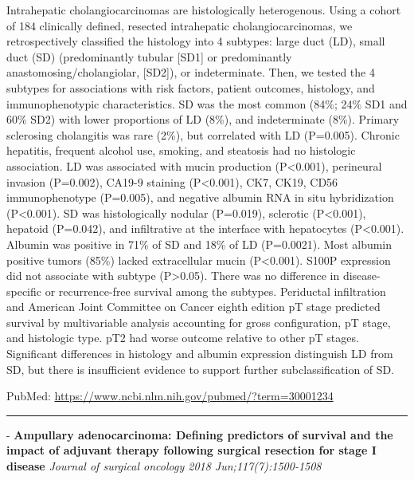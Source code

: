 \documentclass[]{article}
\begin{document}
Intrahepatic cholangiocarcinomas are histologically heterogenous. Using
a cohort of 184 clinically defined, resected intrahepatic
cholangiocarcinomas, we retrospectively classified the histology into 4
subtypes: large duct (LD), small duct (SD) (predominantly tubular
{[}SD1{]} or predominantly anastomosing/cholangiolar, {[}SD2{]}), or
indeterminate. Then, we tested the 4 subtypes for associations with risk
factors, patient outcomes, histology, and immunophenotypic
characteristics. SD was the most common (84\%; 24\% SD1 and 60\% SD2)
with lower proportions of LD (8\%), and indeterminate (8\%). Primary
sclerosing cholangitis was rare (2\%), but correlated with LD (P=0.005).
Chronic hepatitis, frequent alcohol use, smoking, and steatosis had no
histologic association. LD was associated with mucin production
(P\textless{}0.001), perineural invasion (P=0.002), CA19-9 staining
(P\textless{}0.001), CK7, CK19, CD56 immunophenotype (P=0.005), and
negative albumin RNA in situ hybridization (P\textless{}0.001). SD was
histologically nodular (P=0.019), sclerotic (P\textless{}0.001),
hepatoid (P=0.042), and infiltrative at the interface with hepatocytes
(P\textless{}0.001). Albumin was positive in 71\% of SD and 18\% of LD
(P=0.0021). Most albumin positive tumors (85\%) lacked extracellular
mucin (P\textless{}0.001). S100P expression did not associate with
subtype (P\textgreater{}0.05). There was no difference in
disease-specific or recurrence-free survival among the subtypes.
Periductal infiltration and American Joint Committee on Cancer eighth
edition pT stage predicted survival by multivariable analysis accounting
for gross configuration, pT stage, and histologic type. pT2 had worse
outcome relative to other pT stages. Significant differences in
histology and albumin expression distinguish LD from SD, but there is
insufficient evidence to support further subclassification of SD.

PubMed: \url{https://www.ncbi.nlm.nih.gov/pubmed/?term=30001234}

{}

{}

\begin{center}\rule{0.5\linewidth}{\linethickness}\end{center}

 - \textbf{Ampullary adenocarcinoma: Defining predictors of survival and
the impact of adjuvant therapy following surgical resection for stage I
disease} \emph{Journal of surgical oncology 2018 Jun;117(7):1500-1508}
\end{document}
